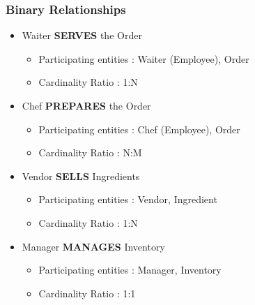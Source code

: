     \subsubsection{Binary Relationships}
        \begin{itemize}
            \item Waiter \textbf{SERVES} the Order
                \begin{itemize}[label=-]
                    \item Participating entities : Waiter (Employee), Order
                    \item Cardinality Ratio : 1:N
                \end{itemize}

            \item Chef \textbf{PREPARES} the Order
                \begin{itemize}[label=-]
                    \item Participating entities : Chef (Employee), Order
                    \item Cardinality Ratio : N:M
                \end{itemize}

            \item Vendor \textbf{SELLS} Ingredients
                \begin{itemize}[label=-]
                    \item Participating entities : Vendor, Ingredient
                    \item Cardinality Ratio : 1:N
                \end{itemize}


            \item Manager \textbf{MANAGES} Inventory
                \begin{itemize}[label=-]
                    \item Participating entities : Manager, Inventory
                    \item Cardinality Ratio : 1:1
                \end{itemize}


\end{itemize}
